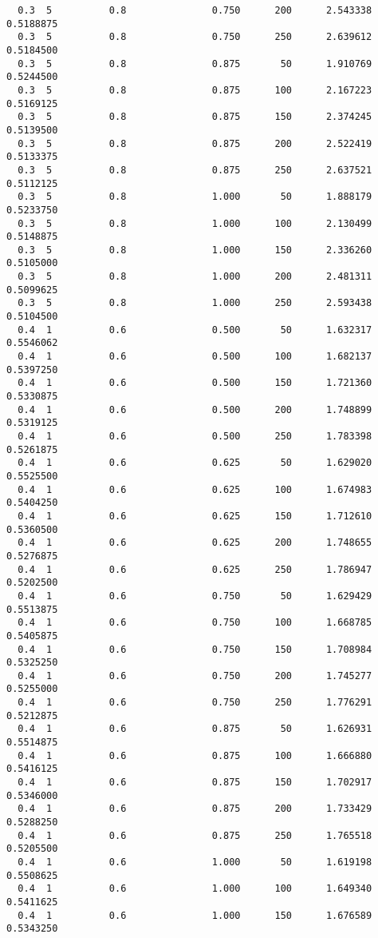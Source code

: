 \documentclass[
  letterpaper,
  DIV=11,
  numbers=noendperiod]{scrartcl}
\begin{document}
\begin{verbatim}
  0.3  5          0.8               0.750      200      2.543338  0.5188875
  0.3  5          0.8               0.750      250      2.639612  0.5184500
  0.3  5          0.8               0.875       50      1.910769  0.5244500
  0.3  5          0.8               0.875      100      2.167223  0.5169125
  0.3  5          0.8               0.875      150      2.374245  0.5139500
  0.3  5          0.8               0.875      200      2.522419  0.5133375
  0.3  5          0.8               0.875      250      2.637521  0.5112125
  0.3  5          0.8               1.000       50      1.888179  0.5233750
  0.3  5          0.8               1.000      100      2.130499  0.5148875
  0.3  5          0.8               1.000      150      2.336260  0.5105000
  0.3  5          0.8               1.000      200      2.481311  0.5099625
  0.3  5          0.8               1.000      250      2.593438  0.5104500
  0.4  1          0.6               0.500       50      1.632317  0.5546062
  0.4  1          0.6               0.500      100      1.682137  0.5397250
  0.4  1          0.6               0.500      150      1.721360  0.5330875
  0.4  1          0.6               0.500      200      1.748899  0.5319125
  0.4  1          0.6               0.500      250      1.783398  0.5261875
  0.4  1          0.6               0.625       50      1.629020  0.5525500
  0.4  1          0.6               0.625      100      1.674983  0.5404250
  0.4  1          0.6               0.625      150      1.712610  0.5360500
  0.4  1          0.6               0.625      200      1.748655  0.5276875
  0.4  1          0.6               0.625      250      1.786947  0.5202500
  0.4  1          0.6               0.750       50      1.629429  0.5513875
  0.4  1          0.6               0.750      100      1.668785  0.5405875
  0.4  1          0.6               0.750      150      1.708984  0.5325250
  0.4  1          0.6               0.750      200      1.745277  0.5255000
  0.4  1          0.6               0.750      250      1.776291  0.5212875
  0.4  1          0.6               0.875       50      1.626931  0.5514875
  0.4  1          0.6               0.875      100      1.666880  0.5416125
  0.4  1          0.6               0.875      150      1.702917  0.5346000
  0.4  1          0.6               0.875      200      1.733429  0.5288250
  0.4  1          0.6               0.875      250      1.765518  0.5205500
  0.4  1          0.6               1.000       50      1.619198  0.5508625
  0.4  1          0.6               1.000      100      1.649340  0.5411625
  0.4  1          0.6               1.000      150      1.676589  0.5343250

\end{verbatim}
\end{document}
